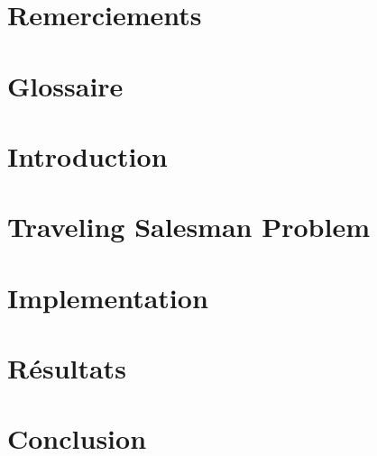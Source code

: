 \documentclass[a4paper,11pt,oneside,fleqn]{book}
\numberwithin{equation}{chapter}									        %
\begin{document}
% 

\frontmatter
\chapter*{Remerciements}


\tableofcontents

\chapter*{Glossaire}


\mainmatter
\chapter{Introduction} \label{ch:intro}

\chapter{Traveling Salesman Problem} \label{ch:tsp}

\chapter{Implementation} \label{ch:implementation}

\chapter{Résultats} \label{ch:resultats}

\chapter{Conclusion} \label{ch:conclusion}


% 

\newpage
\nocite{*}



% 
\end{document}
